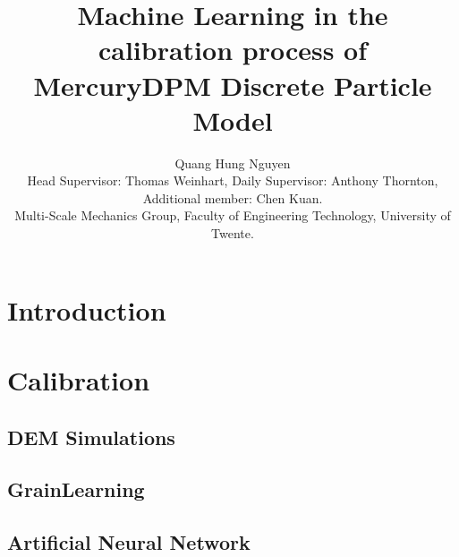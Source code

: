 \documentclass{article}
\title{Machine Learning in the calibration process of MercuryDPM Discrete Particle Model}
\author{Quang Hung Nguyen\\[1ex] \small Head Supervisor: Thomas Weinhart, Daily Supervisor: Anthony Thornton, Additional member: Chen Kuan. \\
\small Multi-Scale Mechanics Group, Faculty of Engineering Technology, University of Twente.}
\date{}
\begin{document}
\maketitle

\section{Introduction}





% 


% 



\section{Calibration}
\subsection{DEM Simulations}


\subsection{GrainLearning}


\subsection{Artificial Neural Network}


\pagebreak  


\end{document}
